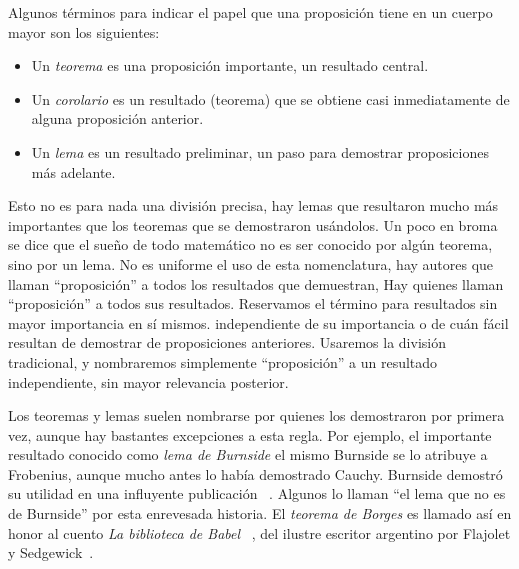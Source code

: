   Algunos términos para indicar el papel que una proposición
  tiene en un cuerpo mayor son los siguientes:
  \begin{itemize}
  \item
    Un \emph{teorema} es una proposición importante,
    un resultado central.
  \item
    Un \emph{corolario} es un resultado
    (teorema)
    que se obtiene casi inmediatamente
    de alguna proposición anterior.
  \item
    Un \emph{lema} es un resultado preliminar,
    un paso para demostrar proposiciones más adelante.
  \end{itemize}
  Esto no es para nada una división precisa,
  hay lemas que resultaron mucho más importantes que los teoremas
  que se demostraron usándolos.
  Un poco en broma se dice que el sueño de todo matemático
  no es ser conocido por algún teorema,
  sino por un lema.
  No es uniforme el uso de esta nomenclatura,
  hay autores que llaman ``proposición''
  a todos los resultados que demuestran,%
	     {Hay quienes llaman ``proposición'' a todos sus resultados.
	      Reservamos el término para resultados sin mayor importancia
	      en sí mismos.}
  independiente de su importancia
  o de cuán fácil resultan de demostrar
  de proposiciones anteriores.
  Usaremos la división tradicional,
  y nombraremos simplemente ``proposición''
  a un resultado independiente,
  sin mayor relevancia posterior.

  Los teoremas y lemas suelen nombrarse
  por quienes los demostraron por primera vez,
  aunque hay bastantes excepciones a esta regla.
  Por ejemplo,
  el importante resultado conocido como \emph{lema de Burnside}%
  el mismo Burnside se lo atribuye a Frobenius,%
  aunque mucho antes lo había demostrado Cauchy.%
  Burnside demostró su utilidad en una influyente publicación~%
    \cite{burnside97:_theor_group_finit_order}.
  Algunos lo llaman ``el lema que no es de Burnside''
  por esta enrevesada historia.
  El \emph{teorema de Borges}%
  es llamado así en honor al cuento \emph{La biblioteca de Babel}~%
    \cite{borges41:_biblioteca_babel},
  del ilustre escritor argentino%
  por Flajolet y Sedgewick~\cite{flajolet09:_analy_combin}.

